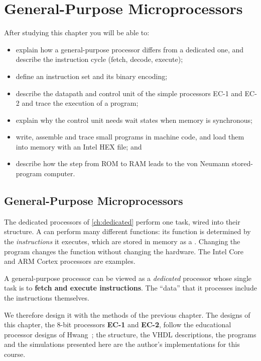 \chapter{General-Purpose Microprocessors}\label{ch:gp}

\begin{objectives}
After studying this chapter you will be able to:
\begin{itemize}
  \item explain how a general-purpose processor differs from a dedicated one, and describe the instruction cycle (fetch, decode, execute);
  \item define an instruction set and its binary encoding;
  \item describe the datapath and control unit of the simple processors EC-1 and EC-2 and trace the execution of a program;
  \item explain why the control unit needs wait states when memory is synchronous;
  \item write, assemble and trace small programs in machine code, and load them into memory with an Intel HEX file; and
  \item describe how the step from ROM to RAM leads to the von Neumann stored-program computer.
\end{itemize}
\end{objectives}

\section{General-Purpose Microprocessors}
The dedicated processors of \cref{ch:dedicated} perform one task, wired into their structure. A  can perform many different functions: its function is determined by the \emph{instructions} it executes, which are stored in memory as a . Changing the program changes the function without changing the hardware. The Intel Core and ARM Cortex processors are examples.

\begin{keypoint}
A general-purpose processor can be viewed as a \emph{dedicated} processor whose single task is to \textbf{fetch and execute instructions}. The ``data'' that it processes include the instructions themselves.
\end{keypoint}

We therefore design it with the methods of the previous chapter. The designs of this chapter, the 8-bit processors \textbf{EC-1} and \textbf{EC-2}, follow the educational processor designs of Hwang~\cite{hwang2005,hwang2018}; the structure, the VHDL descriptions, the programs and the simulations presented here are the author's implementations for this course.

